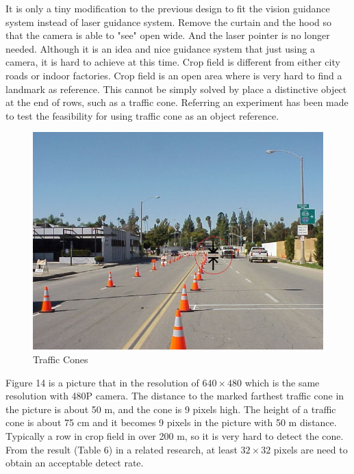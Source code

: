 \documentclass[12pt]{article}
\begin{document}
\begin{flushleft}
It is only a tiny modification to the previous design to fit the vision guidance system instead of laser guidance system. Remove the curtain and the hood so that the camera is able to "see" open wide. And the laser pointer is no longer needed. Although it is an idea and nice guidance system that just using a camera, it is hard to achieve at this time. Crop field is different from either city roads or indoor factories. Crop field is an open area where is very hard to find a landmark as reference. This cannot be simply solved by place a distinctive object at the end of rows, such as a traffic cone. Referring an experiment has been made to test the feasibility for using traffic cone as an object reference. 
\begin{figure}[ht!]
	\begin{center}
		\includegraphics[scale = 0.8]{cone.jpg}
		\caption{Traffic Cones}
	\end{center}
\end{figure}
Figure 14 is a picture that in the resolution of $640\times480$ which is the same resolution with 480P camera. The distance to the marked farthest traffic cone in the picture is about 50 m, and the cone is 9 pixels high. The height of a traffic cone is about 75 cm and it becomes 9 pixels in the picture with 50 m distance. Typically a row in crop field in over 200 m, so it is very hard to detect the cone. From the result (Table 6) in a related research, at least $32\times32$ pixels are need to obtain an acceptable detect rate. \cite{torralba2009many}
\begin{table}[ht!]
	\begin{center}

\end{center}
\end{table}
\end{flushleft}
\end{document}
